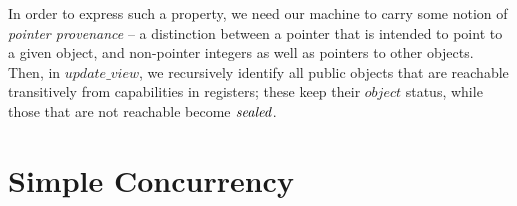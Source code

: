 \documentclass[10pt,conference]{ieeetran}%
\theoremstyle{definition}
\begin{document}
In order to express such a property, we need our machine to carry some notion
of {\it pointer provenance} -- a distinction between a pointer that is intended to
point to a given object, and non-pointer integers as well as pointers to other objects.
Then, in \(\mathit{update\_view}\), we recursively identify all public objects that
are reachable transitively from capabilities in registers; these keep their
\(\mathit{object}\) status, while those that are not reachable become \(\mathit{sealed}\).

\section{Simple Concurrency}



\end{document}
